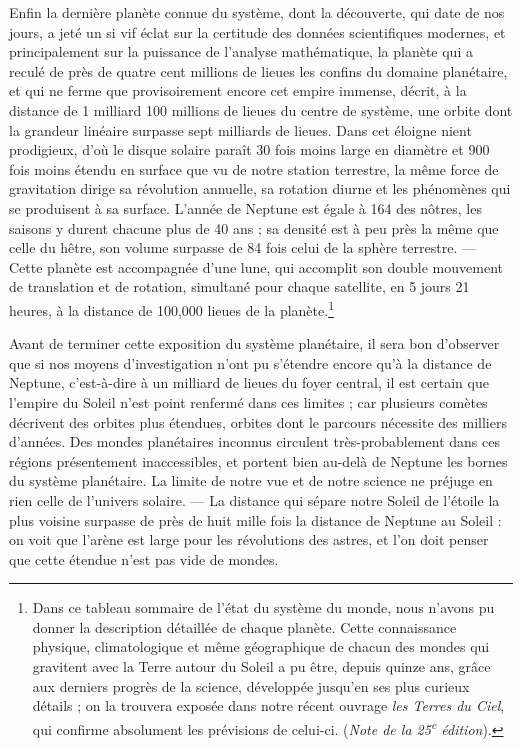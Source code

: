 \documentclass[a4paper, 11pt, oneside]{article}
\begin{document}
Enfin la dernière planète connue du système, dont la découverte, qui date de nos jours, a jeté un si vif éclat sur la certitude des données scientifiques modernes, et principalement sur la puissance de l'analyse mathématique, la planète qui a reculé de près de quatre cent millions de lieues les confins du domaine planétaire, et qui ne ferme que provisoirement encore cet empire immense, décrit, à la distance de 1 milliard 100 millions de lieues du centre de système, une orbite dont la grandeur linéaire surpasse sept milliards de lieues. Dans cet éloigne nient prodigieux, d'où le disque solaire paraît 30 fois moins large en diamètre et 900 fois moins étendu en surface que vu de notre station terrestre, la même force de gravitation dirige sa révolution annuelle, sa rotation diurne et les phénomènes qui se produisent à sa surface. L'année de Neptune est égale à 164 des nôtres, les saisons y durent chacune plus de 40 ans ; sa densité est à peu près la même que celle du hêtre, son volume surpasse de 84 fois celui de la sphère terrestre. --- Cette planète est accompagnée d'une lune, qui accomplit son double mouvement de translation et de rotation, simultané pour chaque satellite, en 5 jours 21 heures, à la distance de 100,000 lieues de la planète.\footnote{Dans ce tableau sommaire de l'état du système du monde, nous n'avons pu donner la description détaillée de chaque planète. Cette connaissance physique, climatologique et même géographique de chacun des mondes qui gravitent avec la Terre autour du Soleil a pu être, depuis quinze ans, grâce aux derniers progrès de la science, développée jusqu'en ses plus curieux détails ; on la trouvera exposée dans notre récent ouvrage \emph{les Terres du Ciel}, qui confirme absolument les prévisions de celui-ci. (\emph{Note de la 25\textsuperscript{e} édition}).}

Avant de terminer cette exposition du système planétaire, il sera bon d'observer que si nos moyens d'investigation n'ont pu s'étendre encore qu'à la distance de Neptune, c'est-à-dire à un milliard de lieues du foyer central, il est certain que l'empire du Soleil n'est 
point renfermé dans ces limites ; car plusieurs comètes décrivent des orbites plus étendues, orbites dont le parcours nécessite des milliers d'années. Des mondes planétaires inconnus circulent très-probablement dans ces régions présentement inaccessibles, et portent bien au-delà de Neptune les bornes du système planétaire. La limite de notre vue et de notre science ne préjuge en rien celle de l'univers solaire. --- La distance qui sépare notre Soleil de l'étoile la plus voisine surpasse de près de huit mille fois la distance de Neptune au Soleil : on voit que l'arène est large pour les révolutions des astres, et l'on doit penser que cette étendue n'est pas vide de mondes.
\end{document}
